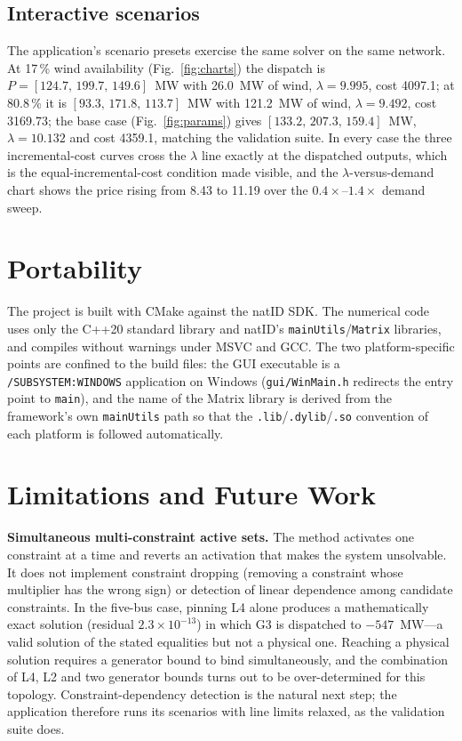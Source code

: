 \documentclass[conference]{IEEEtran}
\begin{document}
\subsection{Interactive scenarios}
The application's scenario presets exercise the same solver on the same network. At 17\,\% wind availability (Fig.~\ref{fig:charts}) the dispatch is $P=[124.7,\,199.7,\,149.6]$~MW with 26.0~MW of wind, $\lambda=9.995$, cost 4097.1; at 80.8\,\% it is $[93.3,\,171.8,\,113.7]$~MW with 121.2~MW of wind, $\lambda=9.492$, cost 3169.73; the base case (Fig.~\ref{fig:params}) gives $[133.2,\,207.3,\,159.4]$~MW, $\lambda=10.132$ and cost 4359.1, matching the validation suite. In every case the three incremental-cost curves cross the $\lambda$ line exactly at the dispatched outputs, which is the equal-incremental-cost condition made visible, and the $\lambda$-versus-demand chart shows the price rising from 8.43 to 11.19 over the $0.4\times$--$1.4\times$ demand sweep.

\section{Portability}
The project is built with CMake against the natID SDK. The numerical code uses only the C++20 standard library and natID's \texttt{mainUtils}/\texttt{Matrix} libraries, and compiles without warnings under MSVC and GCC. The two platform-specific points are confined to the build files: the GUI executable is a \texttt{/SUBSYSTEM:WINDOWS} application on Windows (\texttt{gui/WinMain.h} redirects the entry point to \texttt{main}), and the name of the Matrix library is derived from the framework's own \texttt{mainUtils} path so that the \texttt{.lib}/\texttt{.dylib}/\texttt{.so} convention of each platform is followed automatically.

\section{Limitations and Future Work}
\textbf{Simultaneous multi-constraint active sets.} The method activates one constraint at a time and reverts an activation that makes the system unsolvable. It does not implement constraint dropping (removing a constraint whose multiplier has the wrong sign) or detection of linear dependence among candidate constraints. In the five-bus case, pinning L4 alone produces a mathematically exact solution (residual $2.3\times10^{-13}$) in which G3 is dispatched to $-547$~MW---a valid solution of the stated equalities but not a physical one. Reaching a physical solution requires a generator bound to bind simultaneously, and the combination of L4, L2 and two generator bounds turns out to be over-determined for this topology. Constraint-dependency detection is the natural next step; the application therefore runs its scenarios with line limits relaxed, as the validation suite does.
\end{document}
